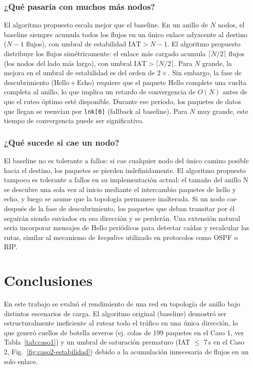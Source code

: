\documentclass[10pt,letterpaper,twocolumn]{article}
\begin{document}
\subsubsection*{¿Qué pasaría con muchos más nodos?}

El algoritmo propuesto escala mejor que el baseline. En un anillo de
$N$ nodos, el baseline siempre acumula todos los flujos en un único
enlace adyacente al destino ($N-1$ flujos), con umbral de estabilidad
$\mathrm{IAT} > N-1$. El algoritmo propuesto distribuye los flujos
simétricamente: el enlace más cargado acumula $\lceil N/2 \rceil$
flujos (los nodos del lado más largo), con umbral
$\mathrm{IAT} > \lceil N/2 \rceil$. Para $N$ grande, la mejora en
el umbral de estabilidad es del orden de $2\times$. Sin embargo, la
fase de descubrimiento (Hello\,+\,Echo) requiere que el paquete Hello
complete una vuelta completa al anillo, lo que implica un retardo de
convergencia de $O(N)$ antes de que el ruteo óptimo esté disponible.
Durante ese período, los paquetes de datos que llegan se reenvían por
\texttt{lnk[0]} (fallback al baseline). Para $N$ muy grande, este
tiempo de convergencia puede ser significativo.

\subsubsection*{¿Qué sucede si cae un nodo?}

El baseline no es tolerante a fallos: si cae cualquier nodo del único
camino posible hacia el destino, los paquetes se pierden
indefinidamente. El algoritmo propuesto tampoco es tolerante a fallos
en su implementación actual: el tamaño del anillo N se descubre una sola
vez al inicio mediante el intercambio paquetes de hello y echo, y
luego se asume que la topología permanece inalterada. Si
un nodo cae después de la fase de descubrimiento, los paquetes que
deban transitar por él seguirán siendo enviados en esa dirección y se
perderán. Una extensión natural sería incorporar mensajes de Hello
periódicos para detectar caídas y recalcular las rutas, similar al
mecanismo de \emph{keepalive} utilizado en protocolos como OSPF o RIP.

\section{Conclusiones}
\label{sec:conclusiones}

En este trabajo se evaluó el rendimiento de una red en topología de anillo bajo distintos escenarios de carga. El algoritmo original (baseline) demostró ser estructuralmente ineficiente al rutear todo el tráfico en una única dirección, lo que generó cuellos de botella severos (ej. colas de 199 paquetes en el Caso 1, ver Tabla~\ref{tab:caso1}) y un umbral de saturación prematuro (IAT $\leq$ 7\,s en el Caso 2, Fig.~\ref{fig:caso2-estabilidad}) debido a la acumulación innecesaria de flujos en un solo enlace.
\end{document}
